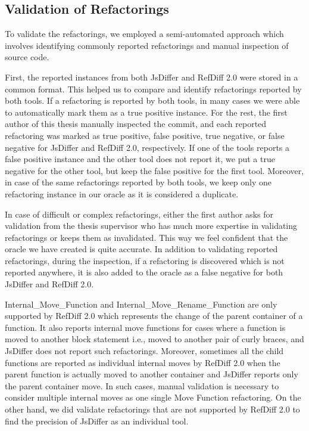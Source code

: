 \documentclass[letterpaper,12pt,onecolumn,final]{report}
\begin{document}
\subsection {Validation of Refactorings}
To validate the refactorings, we employed a semi-automated approach which involves identifying commonly reported refactorings and manual inspection of source code.

First, the reported instances from both JsDiffer and RefDiff 2.0 were stored in a common format. This helped us to compare and identify refactorings reported by both tools. If a refactoring is reported by both tools, in many cases we were able to automatically mark them as a true positive instance. For the rest, the first author of this thesis manually inspected the commit, and each reported refactoring was marked as true positive, false positive, true negative, or false negative for JsDiffer and RefDiff 2.0, respectively. If one of the tools reports a false positive instance and the other tool does not report it, we put a true negative for the other tool, but keep the false positive for the first tool. Moreover, in case of the same refactorings reported by both tools, we keep only one refactoring instance in our oracle as it is considered a duplicate.

In case of difficult or complex refactorings, either the first author asks for validation from the thesis supervisor who has much more expertise in validating refactorings or keeps them as invalidated. This way we feel confident that the oracle we have created is quite accurate. In addition to validating reported refactorings, during the inspection, if a refactoring is discovered which is not reported anywhere, it is also added to the oracle as a false negative for both JsDiffer and RefDiff 2.0. 

Internal\_Move\_Function and Internal\_Move\_Rename\_Function are only supported by RefDiff 2.0 which represents the change of the parent container of a function. It also reports internal move functions for cases where a function is moved to another block statement i.e., moved to another pair of curly braces, and JsDiffer does not report such refactorings. Moreover, sometimes all the child functions are reported as individual internal moves by RefDiff 2.0 when the parent function is actually moved to another container and JsDiffer reports only the parent container move. In such cases, manual validation is necessary to consider multiple internal moves as one single Move Function refactoring. On the other hand, we did validate refactorings that are not supported by RefDiff 2.0 to find the precision of JsDiffer as an individual tool.
\end{document}
